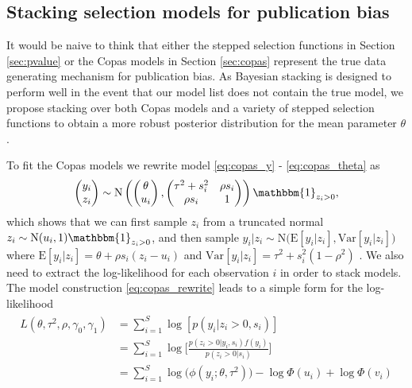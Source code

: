 \documentclass[12pt]{article}   	%
\numberwithin{equation}{section}
\begin{document}
\subsection{Stacking selection models for publication bias} \label{sec:stacked_models}

It would be naive to think that either the stepped selection functions in Section \ref{sec:pvalue} or the Copas models in Section \ref{sec:copas} represent the true data generating mechanism for publication bias. As Bayesian stacking is designed to perform well in the event that our model list does not contain the true model, we propose stacking over both Copas models  \citep{mavridis2013copas, bai2020} and a variety of stepped selection functions to obtain a more robust posterior distribution for the mean parameter $\theta$. 

To fit the Copas models we rewrite model \eqref{eq:copas_y} - \eqref{eq:copas_theta} as 
\begin{align}
\begin{pmatrix}
y_i \\
z_i
\end{pmatrix}\sim \text{N} \left(\begin{pmatrix}
\theta \\
u_i
\end{pmatrix},\begin{pmatrix}
\tau^2 + s_i^2 & \rho s_i \\
\rho s_i & 1
\end{pmatrix}\right) \mathbbm{1}_{z_i > 0}, \label{eq:copas_rewrite}
\end{align}
which shows that we can first sample $z_i$ from a truncated normal $z_i \sim \text{N}(u_i, 1) \mathbbm{1}_{z_i > 0}$, and then sample $y_i \vert z_i \sim \text{N}\big(\text{E}[y_i \vert z_i], \text{Var}[y_i \vert z_i]\big)$ where $\text{E}[y_i \vert z_i] = \theta + \rho s_i (z_i - u_i)$ and $\text{Var}[y_i \vert z_i] = \tau^2 + s_i^2 (1 - \rho ^ 2)$ \citep{mavridis2013copas}. We also need to extract the log-likelihood for each observation $i$ in order to stack models. The model construction \eqref{eq:copas_rewrite} leads to a simple form for the log-likelihood 
\begin{align}
\begin{split}
L(\theta, \tau^2, \rho, \gamma_0, \gamma_1) &= \sum_{i = 1} ^ S \log[p(y_i \vert z_i > 0, s_i)] \\
& = \sum_{i = 1} ^ S \log \Bigg[ \frac{p(z_i > 0 \vert y_i, s_i) f(y_i)}{p(z_i > 0 \vert s_i)} \Bigg] \\
& = \sum_{i = 1} ^ S \log\big(\phi(y_i ; \theta, \tau^2)\big) - \log \Phi(u_i) + \log \Phi(v_i) \label{eq:loglik}
\end{split}
\end{align}
\end{document}
